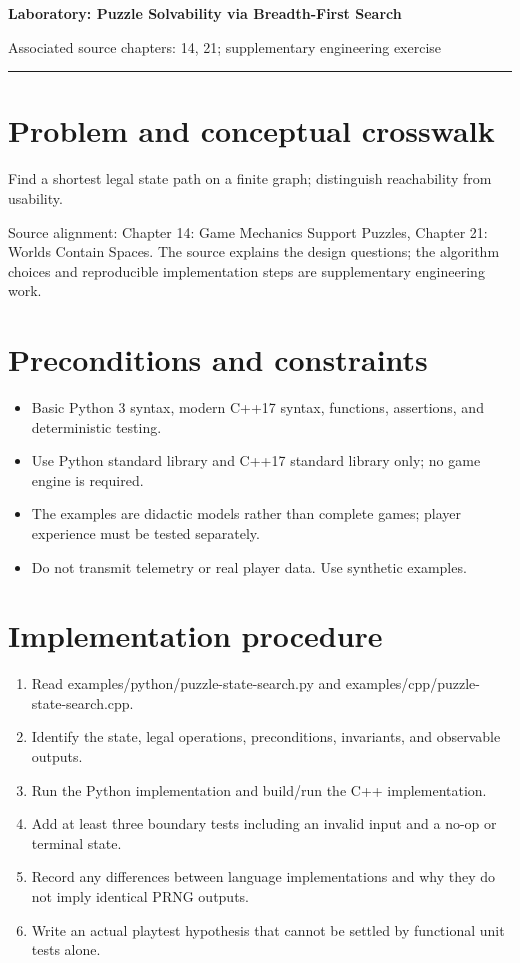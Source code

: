 \documentclass[11pt]{article}
\begin{document}
{\huge\bfseries\color{suiteblue} Laboratory: Puzzle Solvability via Breadth-First Search}\par
\vspace{0.15in}
{\normalsize\color{suitegray} Associated source chapters: 14, 21; supplementary engineering exercise}\par
\vspace{0.15in}\hrule\vspace{0.15in}

\section{Problem and conceptual crosswalk}
Find a shortest legal state path on a finite graph; distinguish reachability from usability.

Source alignment: Chapter 14: Game Mechanics Support Puzzles, Chapter 21: Worlds Contain Spaces. The source explains the design questions; the algorithm choices and reproducible implementation steps are supplementary engineering work.


\section{Preconditions and constraints}
\begin{itemize}
\item Basic Python 3 syntax, modern C++17 syntax, functions, assertions, and deterministic testing.
\item Use Python standard library and C++17 standard library only; no game engine is required.
\item The examples are didactic models rather than complete games; player experience must be tested separately.
\item Do not transmit telemetry or real player data. Use synthetic examples.
\end{itemize}

\section{Implementation procedure}
\begin{enumerate}
\item Read examples/python/puzzle-state-search.py and examples/cpp/puzzle-state-search.cpp.
\item Identify the state, legal operations, preconditions, invariants, and observable outputs.
\item Run the Python implementation and build/run the C++ implementation.
\item Add at least three boundary tests including an invalid input and a no-op or terminal state.
\item Record any differences between language implementations and why they do not imply identical PRNG outputs.
\item Write an actual playtest hypothesis that cannot be settled by functional unit tests alone.
\end{enumerate}
\end{document}
